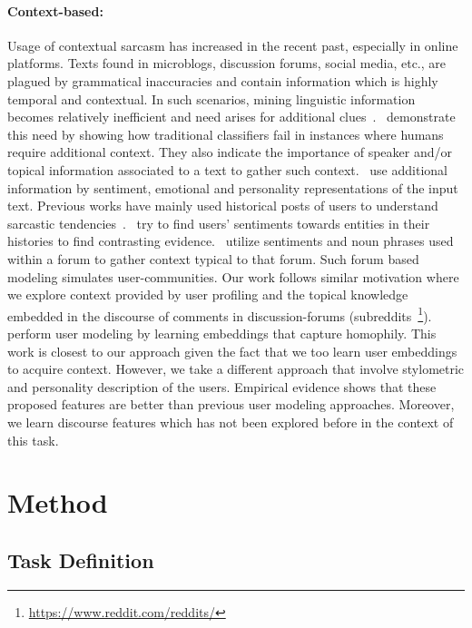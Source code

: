 \documentclass[11pt]{article}
\begin{document}
\paragraph{Context-based: }
Usage of contextual sarcasm has increased in the recent past, especially in online platforms. Texts found in microblogs, discussion forums, social media, etc., are plagued by grammatical inaccuracies and contain information which is highly temporal and contextual. In such scenarios, mining linguistic information becomes relatively inefficient and need arises for additional clues~\cite{carvalho2009clues}.~ demonstrate this need by showing how traditional classifiers fail in instances where humans require additional context. They also indicate the importance of speaker and/or topical information associated to a text to gather such context.~ use additional information by sentiment, emotional and personality representations of the input text. Previous works have mainly used historical posts of users to understand sarcastic tendencies~\cite{rajadesingan2015sarcasm,zhang2016tweet}.~ try to find users' sentiments towards entities in their histories to find contrasting evidence.~  utilize sentiments and noun phrases used within a forum to gather context typical to that forum. Such forum based modeling simulates user-communities. Our work follows similar motivation where we explore context provided by user profiling and the topical knowledge embedded in the discourse of comments in discussion-forums (subreddits~\footnote{\url{https://www.reddit.com/reddits/}}).~ perform user modeling by learning embeddings that capture homophily. This work is closest to our approach given the fact that we too learn user embeddings to acquire context. However, we take a different approach that involve stylometric and personality description of the users. Empirical evidence shows that these proposed features are better than previous user modeling approaches. Moreover, we learn discourse features which has not been explored before in the context of this task.

\section{Method} \label{sec:method} 
\subsection{Task Definition}
\end{document}
